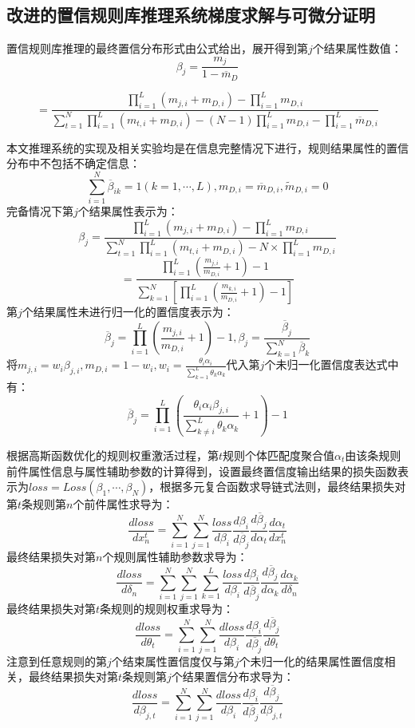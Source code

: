 \documentclass{cjc}
\begin{document}
\subsection{改进的置信规则库推理系统梯度求解与可微分证明}
置信规则库推理的最终置信分布形式由公式给出，展开得到第$j$个结果属性数值：
$$\beta_j=\frac{m_j}{1-\overline{m}_D}$$
\begin{small}
$$=\frac{\prod_{i=1}^L(m_{j,i}+m_{D,i})-\prod_{i=1}^Lm_{D,i}}{\sum_{t=1}^N\prod_{i=1}^L(m_{t,i}+m_{D,i})-(N-1)\prod_{i=1}^Lm_{D,i}-\prod_{i=1}^L\overline{m}_{D,i}}$$
\end{small}
本文推理系统的实现及相关实验均是在信息完整情况下进行，规则结果属性的置信分布中不包括不确定信息：
$$\sum_{i=1}^N\overline{\beta}_{ik}=1(k=1,\cdots,L),m_{D,i}=\overline{m}_{D,i},\widetilde{m}_{D,i}=0$$
完备情况下第$j$个结果属性表示为：
$$\beta_j=\frac{\prod_{i=1}^L(m_{j,i}+m_{D,i})-\prod_{i=1}^Lm_{D,i}}{\sum_{t=1}^N\prod_{i=1}^L(m_{t,i}+m_{D,i})-N\times\prod_{i=1}^Lm_{D,i}}$$
$$=\frac{\prod_{i=1}^L(\frac{m_{j,i}}{m_{D,i}}+1)-1}{\sum_{k=1}^N[\prod_{i=1}^L(\frac{m_{k,i}}{m_{D,i}}+1)-1]}$$
第$j$个结果属性未进行归一化的置信度表示为：
$$\overline{\beta}_j=\prod_{i=1}^L(\frac{m_{j,i}}{m_{D,i}}+1)-1,\beta_j=\frac{\overline{\beta}_j}{\sum_{k=1}^N\overline{\beta}_k}$$
将$m_{j,i}=w_i\beta_{j,i},m_{D,i}=1-w_i,w_i=\frac{\theta_i\alpha_i}{\sum_{k=1}^L\theta_k\alpha_k}$代入第$j$个未归一化置信度表达式中有：
$$\overline{\beta}_j=\prod_{i=1}^L(\frac{\theta_i\alpha_i\beta_{j,i}}{\sum_{k\neq i}^L{\theta_k\alpha_k}}+1)-1$$

根据高斯函数优化的规则权重激活过程，第$t$规则个体匹配度聚合值$\alpha_t$由该条规则前件属性信息与属性辅助参数的计算得到，设置最终置信度输出结果的损失函数表示为$loss=Loss(\beta_1,\cdots,\beta_N)$，根据多元复合函数求导链式法则，最终结果损失对第$t$条规则第$n$个前件属性求导为：
$$\frac{dloss}{dx_n^t}=\sum_{i=1}^N\sum_{j=1}^N \frac{loss}{d\beta_i}\frac{d\beta_i}{d\overline{\beta}_j}\frac{d\overline{\beta}_j}{d\alpha_t}\frac{d\alpha_t}{dx_n^t}$$
最终结果损失对第$n$个规则属性辅助参数求导为：
$$\frac{dloss}{d\delta_n}=\sum_{i=1}^N\sum_{j=1}^N\sum_{k=1}^L \frac{loss}{d\beta_i}\frac{d\beta_i}{d\overline{\beta}_j}\frac{d\overline{\beta}_j}{d\alpha_k}\frac{d\alpha_k}{d\delta_n}$$
最终结果损失对第$t$条规则的规则权重求导为：
$$\frac{dloss}{d\theta_t}=\sum_{i=1}^N\sum_{j=1}^N \frac{dloss}{d\beta_i}\frac{d\beta_i}{d\overline{\beta}_j}\frac{d\overline{\beta}_j}{d\theta_t}$$
注意到任意规则的第$j$个结束属性置信度仅与第$j$个未归一化的结果属性置信度相关，最终结果损失对第$t$条规则第$j$个结果置信分布求导为：
$$\frac{dloss}{d\beta_{j,t}}=\sum_{i=1}^N\sum_{j=1}^N\frac{dloss}{d\beta_i}\frac{d\beta_i}{d\overline{\beta}_j}\frac{d\overline{\beta}_j}{d\beta_{j,t}}$$
\end{document}
